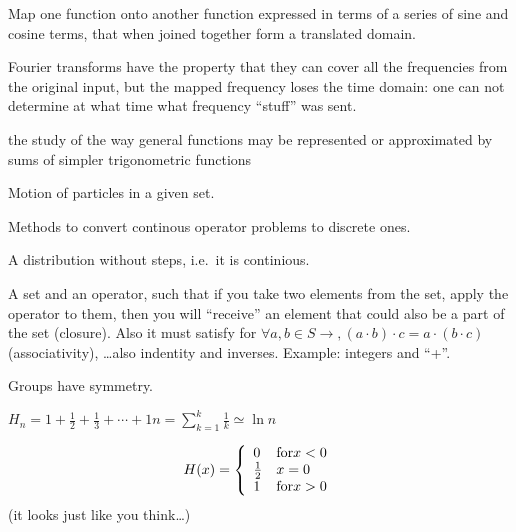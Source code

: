 \begin{definition}
    Map one function onto another function expressed in terms of a 
    series of sine and cosine terms, that when joined together form
    a translated domain.

    Fourier transforms have the property that they can cover all the frequencies
    from the original input, but the mapped frequency loses the time domain:
    one can not determine at what time what frequency ``stuff''  was sent.

\end{definition}

\begin{definition}
    the study of the way general functions may be represented or approximated
    by sums of simpler trigonometric functions

\end{definition}

\begin{definition}[Flow]
    Motion of particles in a given set.
\end{definition}

\begin{definition}
    Methods to convert continous operator problems to discrete ones.
\end{definition}

\begin{definition}
   A distribution without steps, i.e.\ it is continious. 
\end{definition}

\begin{definition}[Group]
    A set and an operator, such that if you take two elements from the set,
    apply the operator to them, then you will ``receive'' an element that
    could also be a part of the set (closure). Also it must satisfy for
    $\forall{a,b} \in S \rightarrow, (a \cdot b) \cdot c = a \cdot (b \cdot c)$ (associativity),
    \dots also indentity and inverses.
    Example: integers and ``+''.

    Groups have symmetry.
\end{definition}

\begin{definition}
    $H_{n} = 1 + \frac{1}{2} + \frac{1}{3} + \cdots + {1}{n} =
    {\sum\limits_{k = 1}^{k}} \frac{1}{k} \simeq \ln n$
\end{definition}

\begin{definition}
    $$
    H(x) = \left\{
            \begin{array}{l l}
                0 & \text{for} x < 0 \\
                \frac{1}{2} & x = 0 \\
                1 & \text{for} x > 0 \\
            \end{array}
        \right.
    $$
    (it looks just like you think\dots)
\end{definition}

